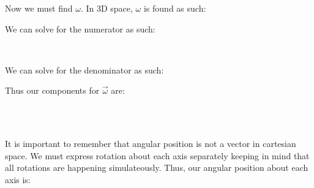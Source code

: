 \documentclass[12pt, letterpaper]{article}
\begin{document}
\noindent Now we must find $\omega$. In 3D space, $\omega$ is found as such:
\begin{center}
\end{center}
We can solve for the numerator as such:
\begin{center}
\\ \bigskip
{}
\end{center}
We can solve for the denominator as such:
\begin{center}
\end{center}
Thus our components for $\vec{\omega}$ are:
\begin{center}
 \\
\vspace{0.2cm}
 \\
\vspace{0.2cm}
\end{center}
\pagebreak
It is important to remember that angular position is not a vector in cartesian space. We must express rotation about each axis separately keeping in mind that all rotations are happening simulateously. Thus, our angular position about each axis is:
\begin{center}
 \\
\vspace{0.2cm}
 \\
\vspace{0.2cm}
\end{center}
\pagebreak
\end{document}
